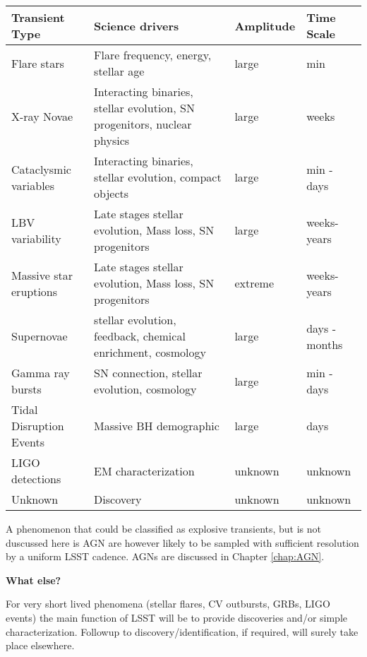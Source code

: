 \begin{center}
\begin{tabular}{| p{3cm} | p{8cm} | l | l |}
\hline Transient Type & Science drivers & Amplitude & Time Scale\\
\hline

Flare stars & Flare frequency, energy, stellar age & large & min \\

X-ray Novae & Interacting binaries, stellar evolution, SN progenitors, nuclear physics & large & weeks \\

Cataclysmic variables  & Interacting binaries, stellar evolution, compact objects & large & min - days\\

LBV variability & Late stages stellar evolution, Mass loss, SN progenitors & large & weeks-years\\

Massive star eruptions &  Late stages stellar evolution, Mass loss, SN progenitors & extreme &  weeks-years\\

Supernovae & stellar evolution, feedback, chemical enrichment, cosmology & large & days - months \\

Gamma ray bursts & SN connection, stellar evolution, cosmology & large & min - days\\

Tidal Disruption Events & Massive BH demographic  & large & days\\

LIGO detections &  EM characterization & unknown & unknown\\

Unknown  & Discovery & unknown & unknown\\

 \hline \end{tabular}
 \end{center}

A phenomenon that could be classified as explosive transients, but is not duscussed here is AGN are however likely to be sampled with sufficient resolution by a uniform LSST cadence. AGNs are discussed in Chapter \ref{chap:AGN}.

{\bf What else?}

For very short lived phenomena (stellar flares, CV outbursts, GRBs, LIGO events) the main function of LSST will be to provide discoveries and/or simple characterization.  Followup to discovery/identification, if required, will surely take place elsewhere.

